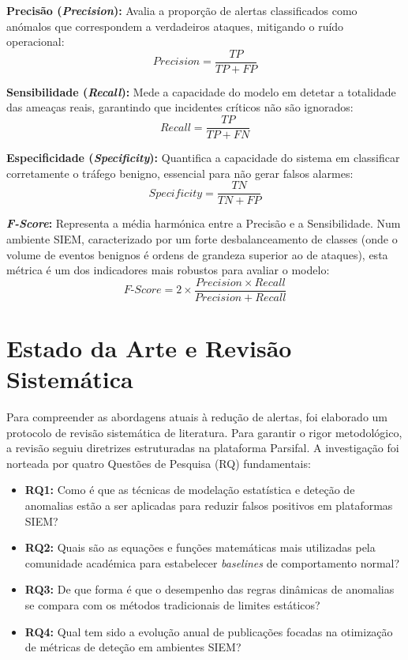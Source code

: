\documentclass[12pt,a4paper]{article}
\begin{document}
\textbf{Precisão (\textit{Precision}):} Avalia a proporção de alertas classificados como anómalos que correspondem a verdadeiros ataques, mitigando o ruído operacional:
\begin{equation}
    Precision = \frac{TP}{TP + FP}
\end{equation}

\textbf{Sensibilidade (\textit{Recall}):} Mede a capacidade do modelo em detetar a totalidade das ameaças reais, garantindo que incidentes críticos não são ignorados:
\begin{equation}
    Recall = \frac{TP}{TP + FN}
\end{equation}

\textbf{Especificidade (\textit{Specificity}):} Quantifica a capacidade do sistema em classificar corretamente o tráfego benigno, essencial para não gerar falsos alarmes:
\begin{equation}
    Specificity = \frac{TN}{TN + FP}
\end{equation}

\textbf{\textit{F-Score}:} Representa a média harmónica entre a Precisão e a Sensibilidade. Num ambiente SIEM, caracterizado por um forte desbalanceamento de classes (onde o volume de eventos benignos é ordens de grandeza superior ao de ataques), esta métrica é um dos indicadores mais robustos para avaliar o modelo:
\begin{equation}
    F\text{-}Score = 2 \times \frac{Precision \times Recall}{Precision + Recall}
\end{equation}

\section{Estado da Arte e Revisão Sistemática}
Para compreender as abordagens atuais à redução de alertas, foi elaborado um protocolo de revisão sistemática de literatura. Para garantir o rigor metodológico, a revisão seguiu diretrizes estruturadas na plataforma Parsifal. A investigação foi norteada por quatro Questões de Pesquisa (RQ) fundamentais:
\begin{itemize}
    \item \textbf{RQ1:} Como é que as técnicas de modelação estatística e deteção de anomalias estão a ser aplicadas para reduzir falsos positivos em plataformas SIEM?
    \item \textbf{RQ2:} Quais são as equações e funções matemáticas mais utilizadas pela comunidade académica para estabelecer \textit{baselines} de comportamento normal?
    \item \textbf{RQ3:} De que forma é que o desempenho das regras dinâmicas de anomalias se compara com os métodos tradicionais de limites estáticos?
    \item \textbf{RQ4:} Qual tem sido a evolução anual de publicações focadas na otimização de métricas de deteção em ambientes SIEM?
\end{itemize}
\end{document}

